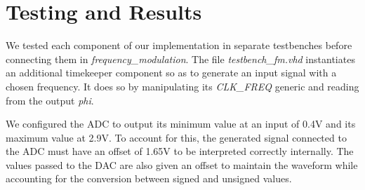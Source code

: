 \section{Testing and Results}

We tested each component of our implementation in separate testbenches before connecting them in \textit{frequency\_modulation}. The file \textit{testbench\_fm.vhd} instantiates an additional timekeeper component so as to generate an input signal with a chosen frequency. It does so by manipulating its \textit{CLK\_FREQ} generic and reading from the output \textit{phi}.

We configured the ADC to output its minimum value at an input of 0.4V and its maximum value at 2.9V. To account for this, the generated signal connected to the ADC must have an offset of 1.65V to be interpreted correctly internally. The values passed to the DAC are also given an offset to maintain the waveform while accounting for the conversion between signed and unsigned values.
  